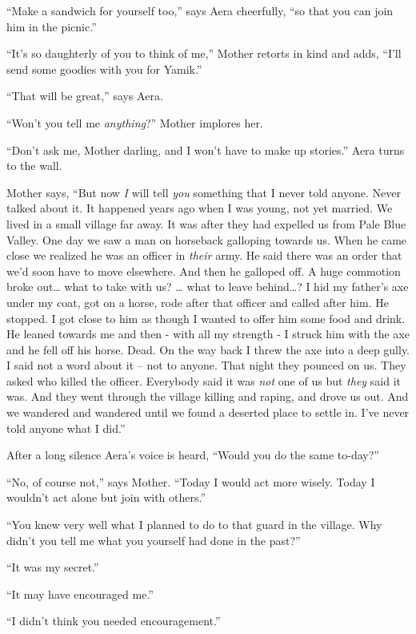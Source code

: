 \documentclass[twoside,11pt]{book}
\begin{document}
``Make a sandwich for yourself too,'' says Aera cheerfully, ``so that you can
join him in the picnic.''

``It's so daughterly of you to think of me,'' Mother retorts in kind and adds,
``I'll send some goodies with you for Yamik.''

``That will be great,'' says Aera.

``Won't you tell me \textit{anything}?'' Mother implores her.

``Don't ask me, Mother darling, and I won't have to make up stories.'' Aera turns to the wall.

Mother says, ``But now \textit{I} will tell \textit{you} something that I never told anyone. Never talked
about it. It happened years ago when I was young, not yet married. We lived in a small village far away. It was after
they had expelled us from Pale Blue Valley. One day we saw a man on horseback galloping towards us.  When he came close
we realized he was an officer in \textit{their} army. He said there was an order that we'd soon have to move elsewhere.
And then he galloped off. A huge commotion broke out{\dots} what to take with us? {\dots} what to leave behind{\dots}?
I hid my father's axe under my coat, got on a horse, rode after that officer and called after him. He stopped. I got
close to him as though I wanted to offer him some food and drink. He leaned towards me and then - with all my strength
- I struck him with the axe and he fell off his horse. Dead. On the way back I threw the axe into a deep gully. I
said not a word about it -- not to anyone. That night they pounced on us. They asked who killed the officer. Everybody
said it was \textit{not} one of us but \textit{they} said it was. And they went through the village killing and raping,
and drove us out. And we wandered and wandered until we found a deserted place to settle in. I've never told anyone
what I did.''

After a long silence Aera's voice is heard, ``Would you do the same to-day?''

``No, of course not,'' says Mother. ``Today I would act more wisely. Today I
wouldn't act alone but join with others.''

``You knew very well what I planned to do to that guard in the village. Why didn't you tell me what you
yourself had done in the past?''

``It was my secret.''

``It may have encouraged me.''

``I didn't think you needed encouragement.''
\end{document}
